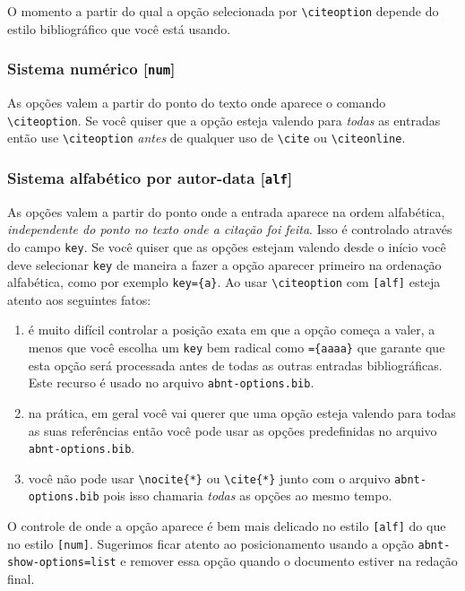 \documentclass[a4paper]{ltxdoc}
\begin{document}
O momento a partir do qual a opção selecionada por \verb+\citeoption+
depende do estilo bibliográfico que você está usando.

\subsubsection{Sistema numérico [{\tt num}]}
As opções valem a partir
do ponto do texto onde aparece o comando \verb+\citeoption+.
Se você quiser que a opção esteja valendo para \emph{todas}
as entradas então use \verb+\citeoption+ \emph{antes} de
qualquer uso de \verb+\cite+ ou \verb+\citeonline+.

\subsubsection{Sistema alfabético por autor-data [{\tt alf}]}
As opções valem a partir do ponto onde a entrada aparece na ordem alfabética,
\emph{independente do ponto no texto onde a citação foi feita}.
Isso é controlado através do campo {\tt key}. Se você quiser que
as opções estejam valendo desde o início você deve selecionar {\tt key}
de maneira a fazer a opção aparecer primeiro na ordenação alfabética,
como por exemplo {\tt key=\{a\}}.
Ao usar \verb+\citeoption+ com {\tt [alf]} esteja atento aos
seguintes fatos:
\begin{enumerate}
\item é muito difícil controlar a posição exata em que a opção
      começa a valer, a menos que você escolha um {\tt key} bem
      radical como {\tt=\{aaaa\}} que garante que esta opção será
      processada antes de todas as outras entradas bibliográficas.
      Este recurso é usado no arquivo {\tt abnt-options.bib}.
\item na prática, em geral você vai querer que uma opção esteja
      valendo para todas as suas referências então você pode usar
      as opções predefinidas no arquivo {\tt abnt-options.bib}.
\item você não pode usar \verb+\nocite{*}+ ou \verb+\cite{*}+
      junto com o arquivo
      {\tt abnt-options.bib} pois isso chamaria \emph{todas} as
      opções ao mesmo tempo.
\end{enumerate}


O controle de onde a opção aparece é bem mais delicado no estilo {\tt [alf]}
do que no estilo {\tt [num]}. Sugerimos ficar atento ao posicionamento
usando a opção {\tt abnt-show-options=list} e remover essa opção quando o
documento estiver na redação final.
\end{document}
